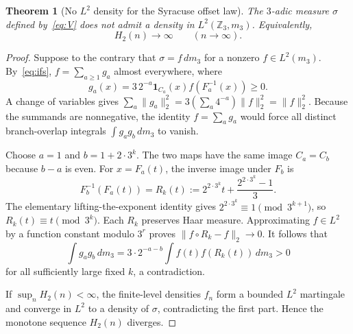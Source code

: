 \documentclass[10pt]{amsart}
\newtheorem{theorem}{Theorem}
\theoremstyle{definition}\newtheorem{definition}[theorem]{Definition}
\theoremstyle{remark}\newtheorem{remark}[theorem]{Remark}
\newcommand{\Z}{\mathbb Z}
\newcommand{\one}{\mathbf1}
\begin{document}
\begin{theorem}[No $L^2$ density for the Syracuse offset law]\label{thm:noL2}
The $3$-adic measure $\sigma$ defined by~\eqref{eq:V} does not admit a density in $L^2(\Z_3,m_3)$. Equivalently,
\begin{equation}\label{eq:L2unbounded}
 H_2(n)\longrightarrow\infty\qquad(n\to\infty).
\end{equation}
\end{theorem}
\begin{proof}
Suppose to the contrary that $\sigma=f\,dm_3$ for a nonzero $f\in L^2(m_3)$. By~\eqref{eq:ifs}, $f=\sum_{a\ge1}g_a$ almost everywhere, where
\[
 g_a(x)=3\,2^{-a}\one_{C_a}(x)f(F_a^{-1}(x))\ge0.
\]
A change of variables gives $\sum_a\|g_a\|_2^2=3(\sum_a4^{-a})\|f\|_2^2=\|f\|_2^2$. Because the summands are nonnegative, the identity $f=\sum_a g_a$ would force all distinct branch-overlap integrals $\int g_ag_b\,dm_3$ to vanish.

Choose $a=1$ and $b=1+2\cdot3^k$. The two maps have the same image $C_a=C_b$ because $b-a$ is even. For $x=F_a(t)$, the inverse image under $F_b$ is
\[
 F_b^{-1}(F_a(t))=R_k(t):=2^{2\cdot3^k}t+\frac{2^{2\cdot3^k}-1}{3}.
\]
The elementary lifting-the-exponent identity gives $2^{2\cdot3^k}\equiv1\pmod{3^{k+1}}$, so $R_k(t)\equiv t\pmod{3^k}$. Each $R_k$ preserves Haar measure. Approximating $f\in L^2$ by a function constant modulo $3^r$ proves $\|f\circ R_k-f\|_2\to0$. It follows that
\[
 \int g_ag_b\,dm_3
 =3\cdot2^{-a-b}\int f(t)f(R_k(t))\,dm_3>0
\]
for all sufficiently large fixed $k$, a contradiction.

If $\sup_nH_2(n)<\infty$, the finite-level densities $f_n$ form a bounded $L^2$ martingale and converge in $L^2$ to a density of $\sigma$, contradicting the first part. Hence the monotone sequence $H_2(n)$ diverges.
\end{proof}
\end{document}
